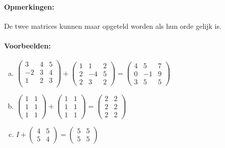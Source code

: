 \documentclass[12pt,twoside]{article}
\begin{document}
\paragraph*{Opmerkingen:} De twee matrices kunnen maar opgeteld worden als hun orde gelijk is.

\needspace{4cm}
\paragraph*{Voorbeelden:}
\begin{enumerate}[(a)]
\item
  $
  \begin{pmatrix}
    3 & 4 & 5\\
    -2 & 3 & 4\\
    1 & 2 & 3\\
  \end{pmatrix}
  +
  \begin{pmatrix}
    1 & 1 & 2\\
    2 & -4 & 5\\
    2 & 3 & 2
  \end{pmatrix}
  =
  \begin{pmatrix}
    4 & 5 & 7\\
    0 & -1 & 9\\
    3 & 5 & 5
  \end{pmatrix}
  $
\item
  $
  \begin{pmatrix}
    1 & 1\\
    1 & 1\\
    1 & 1
  \end{pmatrix}
  +
  \begin{pmatrix}
    1 & 1\\
    1 & 1\\
    1 & 1
  \end{pmatrix}
  =
    \begin{pmatrix}
    2 & 2\\
    2 & 2\\
    2 & 2
  \end{pmatrix}
  $
\item
  $
  I
  +
  \begin{pmatrix}
    4 & 5\\
    5 & 4
  \end{pmatrix}
  =
  \begin{pmatrix}
    5 & 5\\
    5 & 5
  \end{pmatrix}
  $
\end{enumerate}
\end{document}
